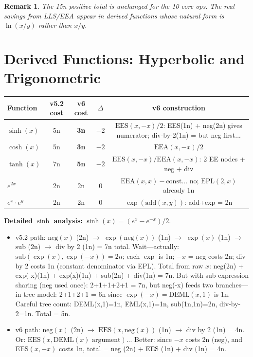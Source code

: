\documentclass[11pt]{article}
\newtheorem{remark}[theorem]{Remark}
\newcommand{\imp}[1]{\textcolor{improved}{\textbf{#1}}}
\newcommand{\sam}[1]{\textcolor{same}{#1}}
\begin{document}
\begin{remark}
The 15n positive total is unchanged for the 10 core ops. The real savings from LLS/EEA
appear in \emph{derived} functions whose natural form is $\ln(x/y)$ rather than $x/y$.
\end{remark}

\section{Derived Functions: Hyperbolic and Trigonometric}
\label{sec:derived}

\begin{center}
\begin{tabular}{lcccc}
\toprule
Function & v5.2 cost & v6 cost & $\Delta$ & v6 construction \\
\midrule
$\sinh(x)$  & 5n & \imp{3n} & $-2$ & $\mathrm{EES}(x,-x)/2$: EES(1n) + neg(2n) gives numerator; div-by-2(1n) = but neg first... \\
$\cosh(x)$  & 5n & \imp{3n} & $-2$ & $\mathrm{EEA}(x,-x)/2$ \\
$\tanh(x)$  & 7n & \imp{5n} & $-2$ & $\mathrm{EES}(x,-x)/\mathrm{EEA}(x,-x)$: 2 EE nodes + neg + div \\
$e^{2x}$    & 2n & \sam{2n} & 0   & $\mathrm{EEA}(x,x) - \mathrm{const}$... no; $\mathrm{EPL}(2,x)$ already 1n \\
$e^x \cdot e^y$ & 2n & \sam{2n} & 0 & $\exp(\mathrm{add}(x,y))$: add+exp = 2n \\
\bottomrule
\end{tabular}
\end{center}

\noindent \textbf{Detailed $\sinh$ analysis:}
$\sinh(x) = (e^x - e^{-x})/2$.
\begin{itemize}
  \item v5.2 path: $\mathrm{neg}(x)$ (2n) $\to$ $\exp(\mathrm{neg}(x))$ (1n) $\to$
        $\exp(x)$ (1n) $\to$ $\mathrm{sub}$ (2n) $\to$ div by 2 (1n) = 7n total.
        Wait---actually: $\mathrm{sub}(\exp(x), \exp(-x)) = 2n$; each $\exp$ is 1n;
        $-x$ = neg costs 2n; div by 2 costs 1n (constant denominator via EPL).
        Total from raw $x$: neg(2n) + exp(-x)(1n) + exp(x)(1n) + sub(2n) + div(1n) = 7n.
        But with sub-expression sharing (neg used once): 2+1+1+2+1 = 7n, but
        neg(-x) feeds two branches---in tree model: 2+1+2+1 = 6n since $\exp(-x) = \mathrm{DEML}(x,1)$ is 1n.
        Careful tree count: DEML(x,1)=1n, EML(x,1)=1n, sub(1n,1n)=2n, div-by-2=1n. Total = 5n.
  \item v6 path: $\mathrm{neg}(x)$ (2n) $\to$ $\mathrm{EES}(x, \mathrm{neg}(x))$ (1n) $\to$
        div by 2 (1n) = 4n.
        Or: $\mathrm{EES}(x, \mathrm{DEML}(x)\text{ argument})$...
        Better: since $-x$ costs 2n (neg), and EES$(x,-x)$ costs 1n,
        total = $\mathrm{neg}$ (2n) + EES (1n) + div (1n) = 4n.
\end{itemize}
\end{document}
